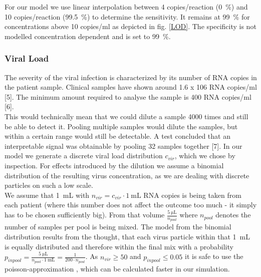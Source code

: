 \documentclass[fleqn,10pt]{wlscirep}
\begin{document}
For our model we use linear interpolation between 4 copies/reaction (\SI{0}{\percent}) and 10 copies/reaction (\SI{99.5}{\percent}) to determine the sensitivity. It remains at \SI{99}{\percent} for concentrations above 10 copies/ml as depicted in fig. \ref{LOD}. The specificity is not modelled concentration dependent and is set to \SI{99}{\percent}. 


\subsubsection{Viral Load}
The severity of the viral infection is characterized by its number of RNA copies in the patient sample. Clinical samples have shown around 1.6 x 106 RNA copies/ml [5]. The minimum amount required to analyse the sample is 400 RNA copies/ml [6].\\

This would technically mean that we could dilute a sample 4000 times and still be able to detect it. Pooling multiple samples would dilute the samples, but within a certain range would still be detectable. A test concluded that an interpretable signal was obtainable by pooling 32 samples together [7]. In our model we generate a discrete viral load distribution $c_{vir}$, which we chose by inspection. For effects introduced by the dilution we assume a binomial distribution of the resulting virus concentration, as we are dealing with discrete particles on such a low scale. \\

We assume that \SI{1}{\milli\liter} with $n_{vir} = c_{vir} \cdot \SI{1}{\milli\liter}$ RNA copies is being taken from each patient (where this number does not affect the outcome too much - it simply has to be chosen sufficiently big). From that volume $\frac{\SI{5}{\micro\liter}}{n_{pool}}$ where $n_{pool}$ denotes the number of samples per pool is being mixed. The model from the binomial distribution results from the thought, that each virus particle within that \SI{1}{\milli\liter} is equally distributed and therefore within the final mix with a probability $p_{in pool} = \frac{\SI{5}{\micro\liter}}{n_{pool} \cdot \SI{1}{\milli\liter}} = \frac{1}{200 \cdot n_{pool}}$. As $n_{vir} \geq 50$ and $p_{in pool} \leq 0.05$ it is safe to use the poisson-approximation \cite{poisson_approx}, which can be calculated faster in our simulation.



\end{document}
